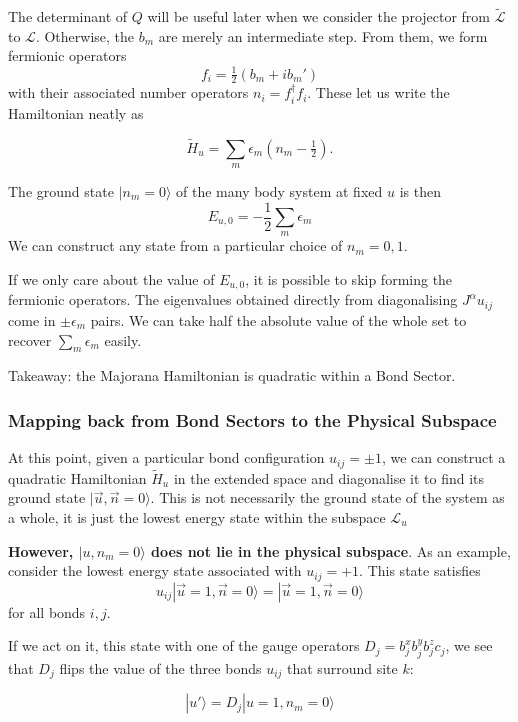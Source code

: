 The determinant of \(Q\) will be useful later when we consider the projector from \(\mathcal{\tilde{L}}\) to \(\mathcal{L}\). Otherwise, the \(b_m\) are merely an intermediate step. From them, we form fermionic operators \[ f_i = \tfrac{1}{2} (b_m + ib_m')\] with their associated number operators \(n_i = f^\dagger_i f_i\). These let us write the Hamiltonian neatly as

\[ \tilde{H}_u = \sum_m \epsilon_m (n_m - \tfrac{1}{2}).\]

The ground state \(|n_m = 0\rangle\) of the many body system at fixed \(u\) is then \[E_{u,0} = -\frac{1}{2}\sum_m \epsilon_m \] We can construct any state from a particular choice of \(n_m = 0,1\).

If we only care about the value of \(E_{u,0}\), it is possible to skip forming the fermionic operators. The eigenvalues obtained directly from diagonalising \(J^{\alpha} u_{ij}\) come in \(\pm \epsilon_m\) pairs. We can take half the absolute value of the whole set to recover \(\sum_m \epsilon_m\) easily.

Takeaway: the Majorana Hamiltonian is quadratic within a Bond Sector.

\hypertarget{mapping-back-from-bond-sectors-to-the-physical-subspace}{%
\subsubsection{Mapping back from Bond Sectors to the Physical Subspace}\label{mapping-back-from-bond-sectors-to-the-physical-subspace}}

At this point, given a particular bond configuration \(u_{ij} = \pm 1\), we can construct a quadratic Hamiltonian \(\tilde{H}_u\) in the extended space and diagonalise it to find its ground state \(|\vec{u}, \vec{n} = 0\rangle\). This is not necessarily the ground state of the system as a whole, it is just the lowest energy state within the subspace \(\mathcal{L}_u\)

\textbf{However, \(|u, n_m = 0\rangle\) does not lie in the physical subspace}. As an example, consider the lowest energy state associated with \(u_{ij} = +1\). This state satisfies \[u_{ij} |\vec{u}=1, \vec{n} = 0\rangle = |\vec{u}=1, \vec{n} = 0\rangle\] for all bonds \(i,j\).

If we act on it, this state with one of the gauge operators \(D_j = b_j^x b_j^y b_j^z c_j\), we see that \(D_j\) flips the value of the three bonds \(u_{ij}\) that surround site \(k\):

\[ |u'\rangle = D_j |u=1, n_m = 0\rangle\]

